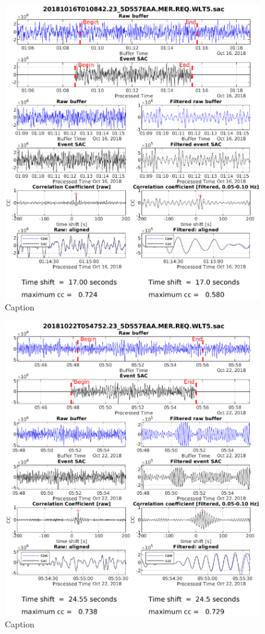 \documentclass[11pt,letterpaper]{article}
\begin{document}
\begin{figure}
    \centering
    \includegraphics[width=\linewidth]{Figures/Matched_SACs/20181016T010842.eps}
    \caption{Caption}
    \label{fig:matched_03}
\end{figure}

\begin{figure}
    \centering
    \includegraphics[width=\linewidth]{Figures/Matched_SACs/20181022T054752.eps}
    \caption{Caption}
    \label{fig:matched_04}
\end{figure}
\end{document}
